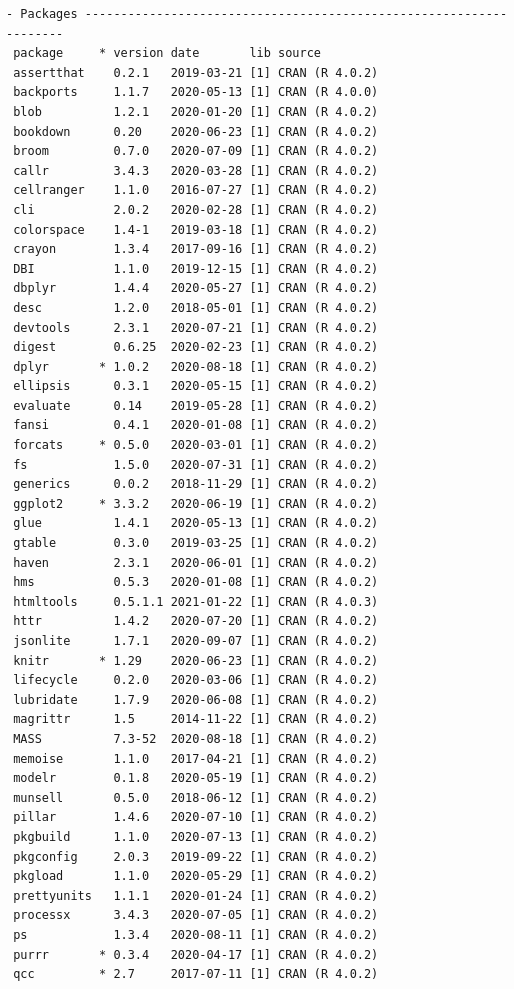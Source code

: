 \documentclass[
]{book}
\begin{document}
\begin{verbatim}
- Packages -------------------------------------------------------------------
 package     * version date       lib source        
 assertthat    0.2.1   2019-03-21 [1] CRAN (R 4.0.2)
 backports     1.1.7   2020-05-13 [1] CRAN (R 4.0.0)
 blob          1.2.1   2020-01-20 [1] CRAN (R 4.0.2)
 bookdown      0.20    2020-06-23 [1] CRAN (R 4.0.2)
 broom         0.7.0   2020-07-09 [1] CRAN (R 4.0.2)
 callr         3.4.3   2020-03-28 [1] CRAN (R 4.0.2)
 cellranger    1.1.0   2016-07-27 [1] CRAN (R 4.0.2)
 cli           2.0.2   2020-02-28 [1] CRAN (R 4.0.2)
 colorspace    1.4-1   2019-03-18 [1] CRAN (R 4.0.2)
 crayon        1.3.4   2017-09-16 [1] CRAN (R 4.0.2)
 DBI           1.1.0   2019-12-15 [1] CRAN (R 4.0.2)
 dbplyr        1.4.4   2020-05-27 [1] CRAN (R 4.0.2)
 desc          1.2.0   2018-05-01 [1] CRAN (R 4.0.2)
 devtools      2.3.1   2020-07-21 [1] CRAN (R 4.0.2)
 digest        0.6.25  2020-02-23 [1] CRAN (R 4.0.2)
 dplyr       * 1.0.2   2020-08-18 [1] CRAN (R 4.0.2)
 ellipsis      0.3.1   2020-05-15 [1] CRAN (R 4.0.2)
 evaluate      0.14    2019-05-28 [1] CRAN (R 4.0.2)
 fansi         0.4.1   2020-01-08 [1] CRAN (R 4.0.2)
 forcats     * 0.5.0   2020-03-01 [1] CRAN (R 4.0.2)
 fs            1.5.0   2020-07-31 [1] CRAN (R 4.0.2)
 generics      0.0.2   2018-11-29 [1] CRAN (R 4.0.2)
 ggplot2     * 3.3.2   2020-06-19 [1] CRAN (R 4.0.2)
 glue          1.4.1   2020-05-13 [1] CRAN (R 4.0.2)
 gtable        0.3.0   2019-03-25 [1] CRAN (R 4.0.2)
 haven         2.3.1   2020-06-01 [1] CRAN (R 4.0.2)
 hms           0.5.3   2020-01-08 [1] CRAN (R 4.0.2)
 htmltools     0.5.1.1 2021-01-22 [1] CRAN (R 4.0.3)
 httr          1.4.2   2020-07-20 [1] CRAN (R 4.0.2)
 jsonlite      1.7.1   2020-09-07 [1] CRAN (R 4.0.2)
 knitr       * 1.29    2020-06-23 [1] CRAN (R 4.0.2)
 lifecycle     0.2.0   2020-03-06 [1] CRAN (R 4.0.2)
 lubridate     1.7.9   2020-06-08 [1] CRAN (R 4.0.2)
 magrittr      1.5     2014-11-22 [1] CRAN (R 4.0.2)
 MASS          7.3-52  2020-08-18 [1] CRAN (R 4.0.2)
 memoise       1.1.0   2017-04-21 [1] CRAN (R 4.0.2)
 modelr        0.1.8   2020-05-19 [1] CRAN (R 4.0.2)
 munsell       0.5.0   2018-06-12 [1] CRAN (R 4.0.2)
 pillar        1.4.6   2020-07-10 [1] CRAN (R 4.0.2)
 pkgbuild      1.1.0   2020-07-13 [1] CRAN (R 4.0.2)
 pkgconfig     2.0.3   2019-09-22 [1] CRAN (R 4.0.2)
 pkgload       1.1.0   2020-05-29 [1] CRAN (R 4.0.2)
 prettyunits   1.1.1   2020-01-24 [1] CRAN (R 4.0.2)
 processx      3.4.3   2020-07-05 [1] CRAN (R 4.0.2)
 ps            1.3.4   2020-08-11 [1] CRAN (R 4.0.2)
 purrr       * 0.3.4   2020-04-17 [1] CRAN (R 4.0.2)
 qcc         * 2.7     2017-07-11 [1] CRAN (R 4.0.2)

\end{verbatim}
\end{document}
